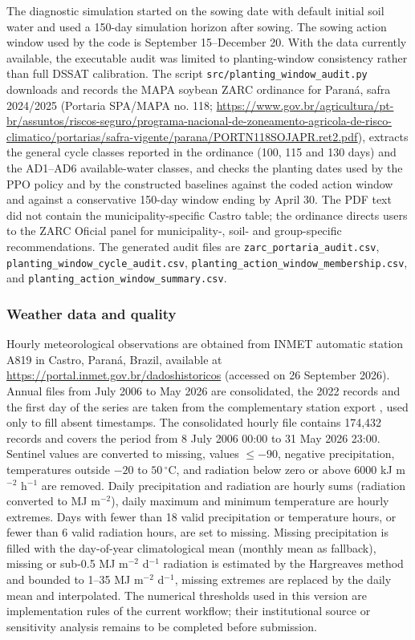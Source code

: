\documentclass[times,final,authoryear]{elsarticle}
\begin{document}
The diagnostic simulation started on the sowing date with default initial soil water and used a 150-day simulation horizon after sowing. The sowing action window used by the code is September 15--December 20. With the data currently available, the executable audit was limited to planting-window consistency rather than full DSSAT calibration. The script \texttt{src/planting\_window\_audit.py} downloads and records the MAPA soybean ZARC ordinance for Paraná, safra 2024/2025 (Portaria SPA/MAPA no. 118; \url{https://www.gov.br/agricultura/pt-br/assuntos/riscos-seguro/programa-nacional-de-zoneamento-agricola-de-risco-climatico/portarias/safra-vigente/parana/PORTN118SOJAPR.ret2.pdf}), extracts the general cycle classes reported in the ordinance (100, 115 and 130 days) and the AD1--AD6 available-water classes, and checks the planting dates used by the PPO policy and by the constructed baselines against the coded action window and against a conservative 150-day window ending by April 30. The PDF text did not contain the municipality-specific Castro table; the ordinance directs users to the ZARC Oficial panel for municipality-, soil- and group-specific recommendations. The generated audit files are \texttt{zarc\_portaria\_audit.csv}, \texttt{planting\_window\_cycle\_audit.csv}, \texttt{planting\_action\_window\_membership.csv}, and \texttt{planting\_action\_window\_summary.csv}.

\subsubsection{Weather data and quality}
\label{subweather}

Hourly meteorological observations are obtained from INMET automatic station A819 in Castro, Paraná, Brazil, available at
\url{https://portal.inmet.gov.br/dadoshistoricos} (accessed on 26 September 2026). Annual files from July 2006 to May 2026 are consolidated, the 2022 records and the first day of the series are taken from the complementary station export , used only to fill absent timestamps. The consolidated hourly file contains 174,432 records and covers the period from 8 July 2006 00:00 to 31 May 2026 23:00. Sentinel values are converted to missing, values $\leq -90$, negative precipitation, temperatures outside $-20$ to $50\,^{\circ}$C, and radiation below zero or above 6000 kJ m$^{-2}$ h$^{-1}$ are removed. Daily precipitation and radiation are hourly sums (radiation converted to MJ m$^{-2}$), daily maximum and minimum temperature are hourly extremes. Days with fewer than 18 valid precipitation or temperature hours, or fewer than 6 valid radiation hours, are set to missing. Missing precipitation is filled with the day-of-year climatological mean (monthly mean as fallback), missing or sub-0.5 MJ m$^{-2}$ d$^{-1}$ radiation is estimated by the Hargreaves method and bounded to 1--35 MJ m$^{-2}$ d$^{-1}$, missing extremes are replaced by the daily mean and interpolated. The numerical thresholds used in this version are implementation rules of the current workflow; their institutional source or sensitivity analysis remains to be completed before submission.
\end{document}

